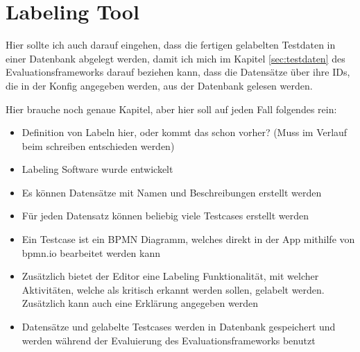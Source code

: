 \section{Labeling Tool}\label{sec:labeling-tool}

Hier sollte ich auch darauf eingehen, dass die fertigen gelabelten Testdaten in einer Datenbank abgelegt werden, damit ich mich im Kapitel \ref{sec:testdaten} des Evaluationsframeworks darauf beziehen kann, dass die Datensätze über ihre IDs, die in der Konfig angegeben werden, aus der Datenbank gelesen werden.

Hier brauche noch genaue Kapitel, aber hier soll auf jeden Fall folgendes rein:
\begin{itemize}
    \item Definition von Labeln hier, oder kommt das schon vorher? (Muss im Verlauf beim schreiben entschieden werden)
    \item Labeling Software wurde entwickelt
    \item Es können Datensätze mit Namen und Beschreibungen erstellt werden
    \item Für jeden Datensatz können beliebig viele Testcases erstellt werden
    \item Ein Testcase ist ein BPMN Diagramm, welches direkt in der App mithilfe von bpmn.io bearbeitet werden kann
    \item Zusätzlich bietet der Editor eine Labeling Funktionalität, mit welcher Aktivitäten, welche als kritisch erkannt werden sollen, gelabelt werden. Zusätzlich kann auch eine Erklärung angegeben werden
    \item Datensätze und gelabelte Testcases werden in Datenbank gespeichert und werden während der Evaluierung des Evaluationsframeworks benutzt
\end{itemize}